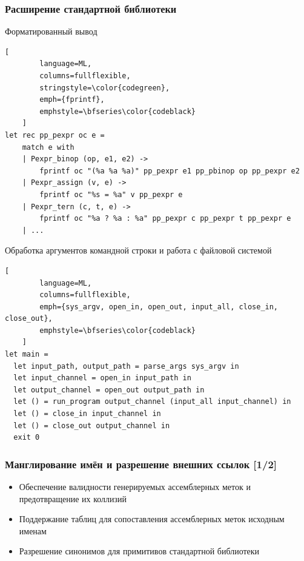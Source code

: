 \documentclass
  [ russian
  , aspectratio=43
  ] {beamer}
\begin{document}
\begin{frame}[fragile]
    \frametitle{Расширение стандартной библиотеки}

    Форматированный вывод

    \begin{lstlisting}[
        language=ML,
        columns=fullflexible,
        stringstyle=\color{codegreen},
        emph={fprintf},
        emphstyle=\bfseries\color{codeblack}
    ]
let rec pp_pexpr oc e =
    match e with
    | Pexpr_binop (op, e1, e2) ->
        fprintf oc "(%a %a %a)" pp_pexpr e1 pp_pbinop op pp_pexpr e2
    | Pexpr_assign (v, e) ->
        fprintf oc "%s = %a" v pp_pexpr e
    | Pexpr_tern (c, t, e) ->
        fprintf oc "%a ? %a : %a" pp_pexpr c pp_pexpr t pp_pexpr e
    | ...
    \end{lstlisting}

    Обработка аргументов командной строки и работа с файловой системой

    \begin{lstlisting}[
        language=ML,
        columns=fullflexible,
        emph={sys_argv, open_in, open_out, input_all, close_in, close_out},
        emphstyle=\bfseries\color{codeblack}
    ]
let main =
  let input_path, output_path = parse_args sys_argv in
  let input_channel = open_in input_path in
  let output_channel = open_out output_path in
  let () = run_program output_channel (input_all input_channel) in
  let () = close_in input_channel in
  let () = close_out output_channel in
  exit 0
    \end{lstlisting}

\end{frame}


\begin{frame}
    \frametitle{\fontsize{13pt}{15.6pt}\selectfont Манглирование имён и разрешение внешних ссылок [1/2]}
    \begin{itemize}
        \item Обеспечение валидности генерируемых ассемблерных меток и предотвращение их коллизий
        \item Поддержание таблиц для сопоставления ассемблерных меток исходным именам
        \item Разрешение синонимов для примитивов стандартной библиотеки
    \end{itemize}
\end{frame}
\end{document}
